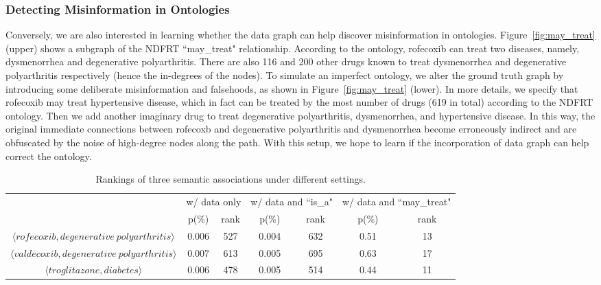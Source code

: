 \subsubsection{Detecting Misinformation in Ontologies}
Conversely, we are also interested in learning whether the data graph can help discover misinformation in ontologies. Figure~\ref{fig:may_treat} (upper) shows a subgraph of the NDFRT ``may\_treat" relationship. According to the ontology, rofecoxib can treat two diseases, namely, dysmenorrhea and degenerative polyarthritis. There are also 116 and 200 other drugs known to treat dysmenorrhea and degenerative polyarthritis respectively (hence the in-degrees of the nodes). To simulate an imperfect ontology, we alter the ground truth graph by introducing some deliberate misinformation and falsehoods, as shown in Figure~\ref{fig:may_treat} (lower). In more details, we specify that rofecoxib may treat hypertensive disease, which in fact can be treated by the most number of drugs (619 in total) according to the NDFRT ontology. Then we add another imaginary drug to treat degenerative polyarthritis, dysmenorrhea, and hypertensive disease. In this way, the original immediate connections between rofecoxb and degenerative polyarthritis and dysmenorrhea become erroneously indirect and are obfuscated by the noise of high-degree nodes along the path. With this setup, we hope to learn if the incorporation of data graph can help correct the ontology.


\begin{table}[htbp]\scriptsize
\begin{center}
\begin{tabular}{ c | c  c | c  c | c  c }
\hline
\multirow{2}{*}{~}        &   \multicolumn{2}{c|}{w/ data only}  &   \multicolumn{2}{c|}{w/ data and ``is\_a"} & \multicolumn{2}{c}{w/ data and ``may\_treat"}\\
\cline{2-7}
                        	&   p(\%)   &   rank    &   p(\%)    &   rank    &   p(\%)    &    rank    \\
\hline
$\langle rofecoxib, degenerative~polyarthritis\rangle$  &   0.006   &   527     &   0.004    &   632     &   0.51     &     13     \\
$\langle valdecoxib, degenerative~polyarthritis\rangle$  &   0.007   &   613     &   0.005    &   695     &   0.63     &     17     \\
$\langle troglitazone, diabetes\rangle$  &   0.006   &   478     &   0.005    &   514     &   0.44     &     11     \\
\hline
\end{tabular}
\end{center}
\caption[Rankings of three semantic associations in health data under different settings]{\label{tbl:health_exp}Rankings of three semantic associations under different settings.}
\end{table}

